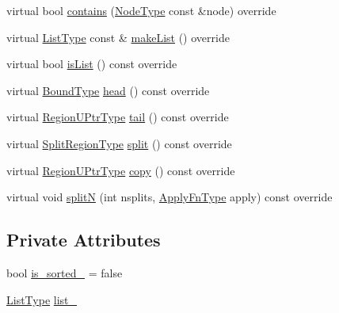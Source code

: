\begin{DoxyCompactItemize}
\item 
virtual bool \hyperlink{structvt_1_1group_1_1region_1_1_list_ac85ec02f77a44a2dadc1b51231e113a7}{contains} (\hyperlink{namespacevt_a866da9d0efc19c0a1ce79e9e492f47e2}{Node\+Type} const \&node) override
\item 
virtual \hyperlink{structvt_1_1group_1_1region_1_1_region_a4e35b2fc6dca06aca0b7bc0e19b35c5a}{List\+Type} const  \& \hyperlink{structvt_1_1group_1_1region_1_1_list_ade171ca43a1bef2feef9952625fba71a}{make\+List} () override
\item 
virtual bool \hyperlink{structvt_1_1group_1_1region_1_1_list_abdde7f8c33453db1938e9a27b3f18bd9}{is\+List} () const override
\item 
virtual \hyperlink{structvt_1_1group_1_1region_1_1_region_abf426ff85bed72c1c6524fad6a9f1751}{Bound\+Type} \hyperlink{structvt_1_1group_1_1region_1_1_list_a99c726e227dbac4f8efaa45a37033238}{head} () const override
\item 
virtual \hyperlink{structvt_1_1group_1_1region_1_1_region_ae5f42cf159116a3cf8bd65423eb01037}{Region\+U\+Ptr\+Type} \hyperlink{structvt_1_1group_1_1region_1_1_list_aaa38a1cc3062ed93fd6d6fbe2c65f1cf}{tail} () const override
\item 
virtual \hyperlink{structvt_1_1group_1_1region_1_1_region_ab8d05c0978c7f38292a9ed5a15498a4b}{Split\+Region\+Type} \hyperlink{structvt_1_1group_1_1region_1_1_list_a0f8352e79bb541ad17ea80843a363304}{split} () const override
\item 
virtual \hyperlink{structvt_1_1group_1_1region_1_1_region_ae5f42cf159116a3cf8bd65423eb01037}{Region\+U\+Ptr\+Type} \hyperlink{structvt_1_1group_1_1region_1_1_list_ac5885572f4cd651003cd6012ba247cda}{copy} () const override
\item 
virtual void \hyperlink{structvt_1_1group_1_1region_1_1_list_ad1950419288564d76527c24bd6d4f3a3}{splitN} (int nsplits, \hyperlink{structvt_1_1group_1_1region_1_1_region_a7c9e99b1157d2fe2f3e6fc36a1463a96}{Apply\+Fn\+Type} apply) const override
\end{DoxyCompactItemize}
\subsection*{Private Attributes}
\begin{DoxyCompactItemize}
\item 
bool \hyperlink{structvt_1_1group_1_1region_1_1_list_ac1c943c35cae4e25a2e65095d5e11bb4}{is\+\_\+sorted\+\_\+} = false
\item 
\hyperlink{structvt_1_1group_1_1region_1_1_region_a4e35b2fc6dca06aca0b7bc0e19b35c5a}{List\+Type} \hyperlink{structvt_1_1group_1_1region_1_1_list_a572bda4d9766fc8eb0c5eaca48f7b416}{list\+\_\+}
\end{DoxyCompactItemize}
